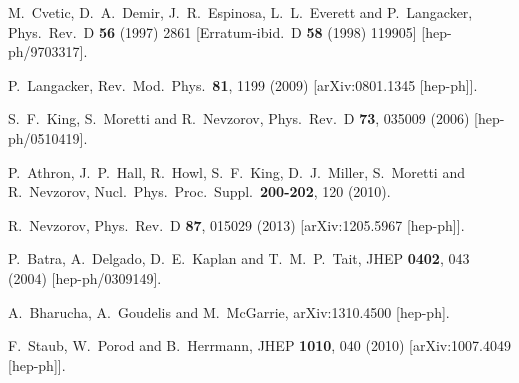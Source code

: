\documentclass[final,3p,11pt,pdflatex]{elsarticle}
\begin{document}
\begin{thebibliography}{100}
  M.~Cvetic, D.~A.~Demir, J.~R.~Espinosa, L.~L.~Everett and P.~Langacker,
  Phys.\ Rev.\ D {\bf 56} (1997) 2861
   [Erratum-ibid.\ D {\bf 58} (1998) 119905]
  [hep-ph/9703317].

  P.~Langacker,
  Rev.\ Mod.\ Phys.\  {\bf 81}, 1199 (2009)
  [arXiv:0801.1345 [hep-ph]].



  S.~F.~King, S.~Moretti and R.~Nevzorov,
  Phys.\ Rev.\ D {\bf 73}, 035009 (2006)
  [hep-ph/0510419].

  P.~Athron, J.~P.~Hall, R.~Howl, S.~F.~King, D.~J.~Miller, S.~Moretti and R.~Nevzorov,
  Nucl.\ Phys.\ Proc.\ Suppl.\  {\bf 200-202}, 120 (2010).

  R.~Nevzorov,
  Phys.\ Rev.\ D {\bf 87}, 015029 (2013)
  [arXiv:1205.5967 [hep-ph]].



  P.~Batra, A.~Delgado, D.~E.~Kaplan and T.~M.~P.~Tait,
  JHEP {\bf 0402}, 043 (2004)
  [hep-ph/0309149].

  A.~Bharucha, A.~Goudelis and M.~McGarrie,
  arXiv:1310.4500 [hep-ph].

  F.~Staub, W.~Porod and B.~Herrmann,
  JHEP {\bf 1010}, 040 (2010)
  [arXiv:1007.4049 [hep-ph]].


\end{thebibliography}
\end{document}
